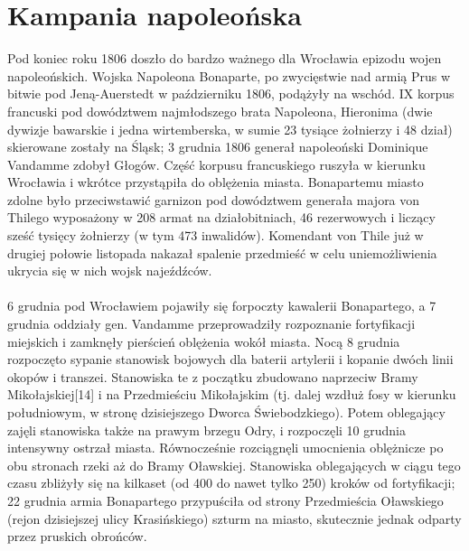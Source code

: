 \documentclass{article}
\begin{document}
\section{Kampania napoleońska}
Pod koniec roku 1806 doszło do bardzo ważnego dla Wrocławia epizodu wojen napoleońskich. Wojska Napoleona Bonaparte, po zwycięstwie nad armią Prus w bitwie pod Jeną-Auerstedt w październiku 1806, podążyły na wschód. IX korpus francuski pod dowództwem najmłodszego brata Napoleona, Hieronima (dwie dywizje bawarskie i jedna wirtemberska, w sumie 23 tysiące żołnierzy i 48 dział) skierowane zostały na Śląsk; 3 grudnia 1806 generał napoleoński Dominique Vandamme zdobył Głogów. Część korpusu francuskiego ruszyła w kierunku Wrocławia i wkrótce przystąpiła do oblężenia miasta. Bonapartemu miasto zdolne było przeciwstawić garnizon pod dowództwem generała majora von Thilego wyposażony w 208 armat na działobitniach, 46 rezerwowych i liczący sześć tysięcy żołnierzy (w tym 473 inwalidów). Komendant von Thile już w drugiej połowie listopada nakazał spalenie przedmieść w celu uniemożliwienia ukrycia się w nich wojsk najeźdźców.\\
\\
6 grudnia pod Wrocławiem pojawiły się forpoczty kawalerii Bonapartego, a 7 grudnia oddziały gen. Vandamme przeprowadziły rozpoznanie fortyfikacji miejskich i zamknęły pierścień oblężenia wokół miasta. Nocą 8 grudnia rozpoczęto sypanie stanowisk bojowych dla baterii artylerii i kopanie dwóch linii okopów i transzei. Stanowiska te z początku zbudowano naprzeciw Bramy Mikołajskiej[14] i na Przedmieściu Mikołajskim (tj. dalej wzdłuż fosy w kierunku południowym, w stronę dzisiejszego Dworca Świebodzkiego). Potem oblegający zajęli stanowiska także na prawym brzegu Odry, i rozpoczęli 10 grudnia intensywny ostrzał miasta. Równocześnie rozciągnęli umocnienia oblężnicze po obu stronach rzeki aż do Bramy Oławskiej. Stanowiska oblegających w ciągu tego czasu zbliżyły się na kilkaset (od 400 do nawet tylko 250) kroków od fortyfikacji; 22 grudnia armia Bonapartego przypuściła od strony Przedmieścia Oławskiego (rejon dzisiejszej ulicy Krasińskiego) szturm na miasto, skutecznie jednak odparty przez pruskich obrońców.\\
\\
\end{document}

